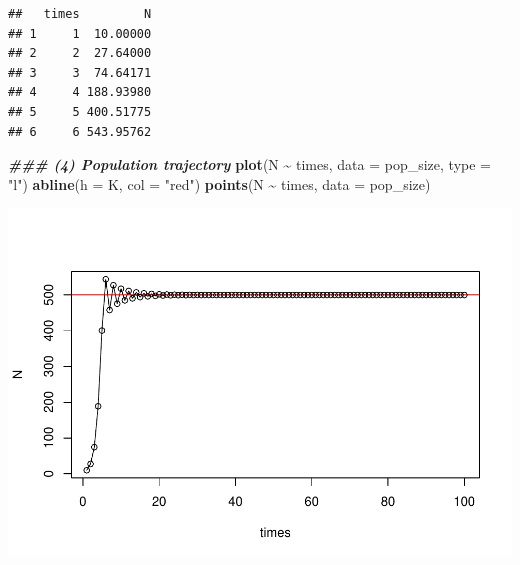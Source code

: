 \documentclass[
]{book}
\newenvironment{Shaded}{\begin{snugshade}}{\end{snugshade}}
\newcommand{\AttributeTok}[1]{\textcolor[rgb]{0.13,0.29,0.53}{#1}}
\newcommand{\ControlFlowTok}[1]{\textcolor[rgb]{0.13,0.29,0.53}{\textbf{#1}}}
\newcommand{\DecValTok}[1]{\textcolor[rgb]{0.00,0.00,0.81}{#1}}
\newcommand{\DocumentationTok}[1]{\textcolor[rgb]{0.56,0.35,0.01}{\textbf{\textit{#1}}}}
\newcommand{\FunctionTok}[1]{\textcolor[rgb]{0.13,0.29,0.53}{\textbf{#1}}}
\newcommand{\NormalTok}[1]{#1}
\newcommand{\OtherTok}[1]{\textcolor[rgb]{0.56,0.35,0.01}{#1}}
\newcommand{\SpecialCharTok}[1]{\textcolor[rgb]{0.81,0.36,0.00}{\textbf{#1}}}
\newcommand{\StringTok}[1]{\textcolor[rgb]{0.31,0.60,0.02}{#1}}
\begin{document}
\begin{Shaded}
\end{Shaded}

\begin{verbatim}
##   times         N
## 1     1  10.00000
## 2     2  27.64000
## 3     3  74.64171
## 4     4 188.93980
## 5     5 400.51775
## 6     6 543.95762
\end{verbatim}

\begin{Shaded}
\begin{Highlighting}[]
\DocumentationTok{\#\#\# (4) Population trajectory}
\FunctionTok{plot}\NormalTok{(N }\SpecialCharTok{\textasciitilde{}}\NormalTok{ times, }\AttributeTok{data =}\NormalTok{ pop\_size, }\AttributeTok{type =} \StringTok{"l"}\NormalTok{)}
\FunctionTok{abline}\NormalTok{(}\AttributeTok{h =}\NormalTok{ K, }\AttributeTok{col =} \StringTok{"red"}\NormalTok{)}
\FunctionTok{points}\NormalTok{(N }\SpecialCharTok{\textasciitilde{}}\NormalTok{ times, }\AttributeTok{data =}\NormalTok{ pop\_size)}
\end{Highlighting}
\end{Shaded}

\includegraphics{bookdown-demo_files/figure-latex/unnamed-chunk-14-1.pdf}
\end{document}
